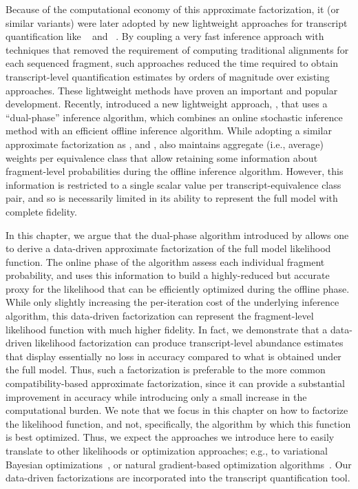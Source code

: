 Because of the computational economy of this approximate factorization, it 
(or similar variants) were later adopted by new lightweight approaches for 
transcript quantification like \sailfish~\citep{Patro2014Sailfish,Srivastava2016rapmap} 
and \kallisto~\citep{Bray2016Kallisto}.  By coupling a very fast inference approach with 
techniques that removed the requirement of computing traditional alignments for each 
sequenced fragment, such approaches reduced the time required to obtain transcript-level 
quantification estimates by orders of magnitude over existing approaches.  These 
lightweight methods have proven an important and popular development.  Recently, 
\citet{Patro2017Salmon} introduced a new lightweight approach, \salmon, that uses a 
``dual-phase'' inference algorithm, which combines an online stochastic inference method 
with an efficient offline inference algorithm. While adopting a similar approximate 
factorization as \mmseq, \sailfish and \kallisto, \salmon also maintains aggregate 
(i.e., average) weights per equivalence class that allow retaining some information 
about fragment-level probabilities during the offline inference algorithm.  However, this 
information is restricted to a single scalar value per transcript-equivalence class pair, 
and so is necessarily limited in its ability to represent the full model with complete 
fidelity.

In this chapter, we argue that the dual-phase algorithm introduced by \salmon 
allows one to derive a data-driven approximate factorization of the full model 
likelihood function.  The online phase of the algorithm assess each individual 
fragment probability, and uses this information to build a highly-reduced but 
accurate proxy for the \fm likelihood that can be efficiently optimized during 
the offline phase. While only slightly increasing the per-iteration cost of the 
underlying inference algorithm, this data-driven factorization can represent the 
fragment-level likelihood function with much higher fidelity.  In fact, we 
demonstrate that a data-driven likelihood factorization can produce transcript-level 
abundance estimates that display essentially no loss in accuracy compared to what is 
obtained under the full model.  Thus, such a factorization is preferable to the more 
common compatibility-based approximate factorization, since it can provide a substantial 
improvement in accuracy while introducing only a small increase in the computational 
burden.  We note that we focus in this chapter on how to factorize the likelihood function, 
and not, specifically, the algorithm by which this function is best optimized.  Thus, we 
expect the approaches we introduce here to easily translate to other likelihoods or 
optimization approaches; e.g., to variational Bayesian optimizations~\citep{tigar}, or 
natural gradient-based optimization algorithms~\citep{bitseqvb}. Our data-driven 
factorizations are incorporated into the \salmon transcript quantification tool.

